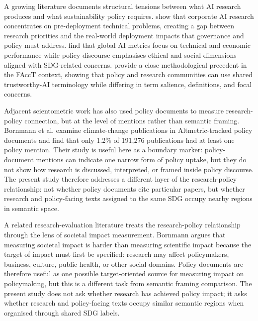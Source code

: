 \documentclass[12pt,a4paper]{article}
\begin{document}
A growing literature documents structural tensions between what AI research produces and what sustainability policy requires. \textcite{Strauss2025} show that corporate AI research concentrates on pre-deployment technical problems, creating a gap between research priorities and the real-world deployment impacts that governance and policy must address. \textcite{SioumalasChristodoulou2025} find that global AI metrics focus on technical and economic performance while policy discourse emphasises ethical and social dimensions aligned with SDG-related concerns. \textcite{ToneyWails2024} provide a close methodological precedent in the FAccT context, showing that policy and research communities can use shared trustworthy-AI terminology while differing in term salience, definitions, and focal concerns.

Adjacent scientometric work has also used policy documents to measure research-policy connection, but at the level of mentions rather than semantic framing. Bornmann et al. \parencite{bornmann2016policy} examine climate-change publications in Altmetric-tracked policy documents and find that only 1.2\% of 191,276 publications had at least one policy mention. Their study is useful here as a boundary marker: policy-document mentions can indicate one narrow form of policy uptake, but they do not show how research is discussed, interpreted, or framed inside policy discourse. The present study therefore addresses a different layer of the research-policy relationship: not whether policy documents cite particular papers, but whether research and policy-facing texts assigned to the same SDG occupy nearby regions in semantic space.

A related research-evaluation literature treats the research-policy relationship through the lens of societal impact measurement. Bornmann \parencite{bornmann2017impact} argues that measuring societal impact is harder than measuring scientific impact because the target of impact must first be specified: research may affect policymakers, business, culture, public health, or other social domains. Policy documents are therefore useful as one possible target-oriented source for measuring impact on policymaking, but this is a different task from semantic framing comparison. The present study does not ask whether research has achieved policy impact; it asks whether research and policy-facing texts occupy similar semantic regions when organised through shared SDG labels.
\end{document}
